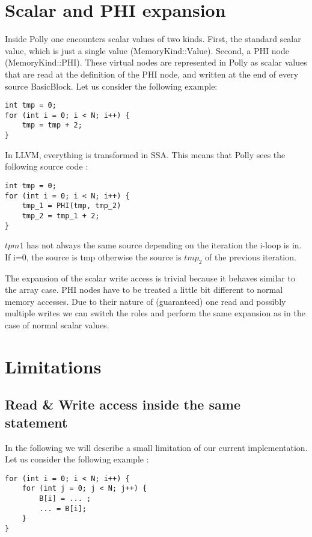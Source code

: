 \section{Scalar and PHI expansion}
Inside Polly one encounters scalar values of two kinds. First, the standard scalar value, which is just a single value (MemoryKind::Value). Second, a PHI node (MemoryKind::PHI). These virtual nodes are represented in Polly as scalar values that are read at the definition of the PHI node, and written at the end of every source BasicBlock. Let us consider the following example:

\begin{lstlisting}[frame=single]
int tmp = 0;
for (int i = 0; i < N; i++) {
    tmp = tmp + 2;
}
\end{lstlisting}

In LLVM, everything is transformed in SSA. This means that Polly sees the following source code :

\begin{lstlisting}[frame=single]
int tmp = 0;
for (int i = 0; i < N; i++) {
    tmp_1 = PHI(tmp, tmp_2)
    tmp_2 = tmp_1 + 2;
}
\end{lstlisting}

$tpm1$ has not always the same source depending on the iteration the i-loop is in. If i=0, the source is tmp otherwise the source is $tmp_2$ of the previous iteration.

The expansion of the scalar write access is trivial because it behaves similar to the array case. PHI nodes have to be treated a little bit different to normal memory accesses. Due to their nature of (guaranteed) one read and possibly multiple writes we can switch the roles and perform the same expansion as in the case of normal scalar values.


\section{Limitations}
\subsection{Read & Write access inside the same statement}
In the following we will describe a small limitation of our current implementation. Let us consider the following example :

\begin{lstlisting}[frame=single]
for (int i = 0; i < N; i++) {
    for (int j = 0; j < N; j++) {
        B[i] = ... ;
        ... = B[i];
    }
}
\end{lstlisting}

